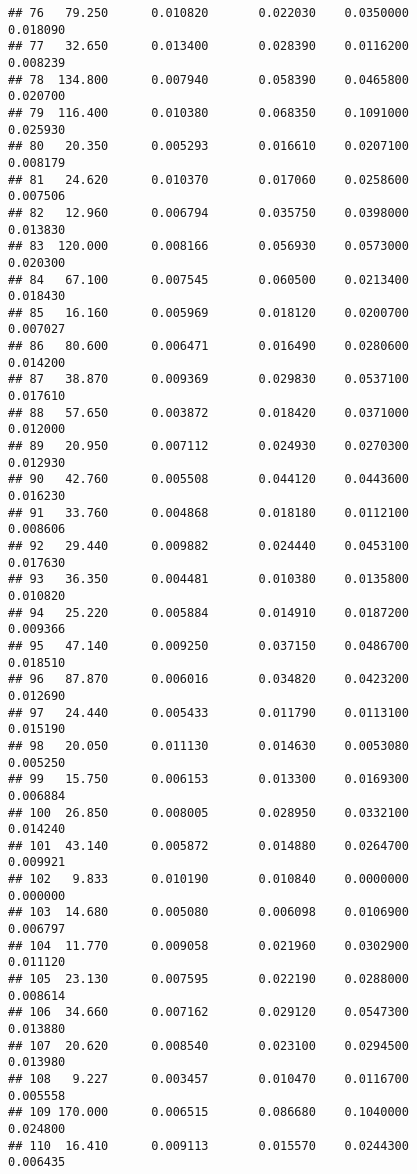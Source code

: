 \documentclass[
]{article}
\begin{document}
\begin{verbatim}
## 76   79.250      0.010820       0.022030    0.0350000          0.018090
## 77   32.650      0.013400       0.028390    0.0116200          0.008239
## 78  134.800      0.007940       0.058390    0.0465800          0.020700
## 79  116.400      0.010380       0.068350    0.1091000          0.025930
## 80   20.350      0.005293       0.016610    0.0207100          0.008179
## 81   24.620      0.010370       0.017060    0.0258600          0.007506
## 82   12.960      0.006794       0.035750    0.0398000          0.013830
## 83  120.000      0.008166       0.056930    0.0573000          0.020300
## 84   67.100      0.007545       0.060500    0.0213400          0.018430
## 85   16.160      0.005969       0.018120    0.0200700          0.007027
## 86   80.600      0.006471       0.016490    0.0280600          0.014200
## 87   38.870      0.009369       0.029830    0.0537100          0.017610
## 88   57.650      0.003872       0.018420    0.0371000          0.012000
## 89   20.950      0.007112       0.024930    0.0270300          0.012930
## 90   42.760      0.005508       0.044120    0.0443600          0.016230
## 91   33.760      0.004868       0.018180    0.0112100          0.008606
## 92   29.440      0.009882       0.024440    0.0453100          0.017630
## 93   36.350      0.004481       0.010380    0.0135800          0.010820
## 94   25.220      0.005884       0.014910    0.0187200          0.009366
## 95   47.140      0.009250       0.037150    0.0486700          0.018510
## 96   87.870      0.006016       0.034820    0.0423200          0.012690
## 97   24.440      0.005433       0.011790    0.0113100          0.015190
## 98   20.050      0.011130       0.014630    0.0053080          0.005250
## 99   15.750      0.006153       0.013300    0.0169300          0.006884
## 100  26.850      0.008005       0.028950    0.0332100          0.014240
## 101  43.140      0.005872       0.014880    0.0264700          0.009921
## 102   9.833      0.010190       0.010840    0.0000000          0.000000
## 103  14.680      0.005080       0.006098    0.0106900          0.006797
## 104  11.770      0.009058       0.021960    0.0302900          0.011120
## 105  23.130      0.007595       0.022190    0.0288000          0.008614
## 106  34.660      0.007162       0.029120    0.0547300          0.013880
## 107  20.620      0.008540       0.023100    0.0294500          0.013980
## 108   9.227      0.003457       0.010470    0.0116700          0.005558
## 109 170.000      0.006515       0.086680    0.1040000          0.024800
## 110  16.410      0.009113       0.015570    0.0244300          0.006435

\end{verbatim}
\end{document}
